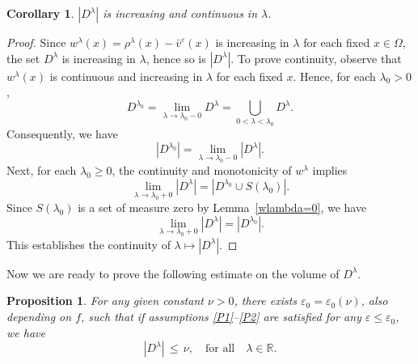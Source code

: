 \documentclass[a4paper,12pt,fullpage]{article}
\numberwithin{equation}{section}
\newtheorem{Cor}[Lemma]{Corollary}
\newtheorem{Prop}[Lemma]{Proposition}
\def\R{{\mathbb R}}
\def\ep{\varepsilon}
\begin{document}
\begin{Cor}\label{cor:D-lambda-conti}
$|D^\lambda|$ is increasing and continuous in $\lambda$. 
\end{Cor}

\begin{proof}
Since $w^\lambda(x)=\rho^\lambda(x)-\bar{v}^\ep(x)$ is increasing in $\lambda$ for each fixed $x\in\Omega$, the set $D^\lambda$ is increasing in $\lambda$, hence so is $|D^\lambda|$. To prove continuity, observe that $w^\lambda(x)$ is continuous and increasing in $\lambda$ for each fixed $x$. Hence, for each $\lambda_0>0$,
\[
D^{\lambda_0}=\lim_{\lambda\to\lambda_0-0}D^\lambda=\bigcup_{0<\lambda<\lambda_0} D^\lambda.
\]
Consequently, we have
\[
|D^{\lambda_0}|=\lim_{\lambda\to\lambda_0-0}|D^\lambda|.
\]
Next, for each $\lambda_0\geq 0$, the continuity and monotonicity of $w^\lambda$ implies
\[
\lim_{\lambda\to\lambda_0+0}|D^\lambda|=|D^{\lambda_0}\cup S(\lambda_0)|.
\]
Since $S(\lambda_0)$ is a set of measure zero by Lemma~\ref{wlambda=0}, we have
\[
\lim_{\lambda\to\lambda_0+0}|D^\lambda|=|D^{\lambda_0}|.
\]
This establishes the continuity of $\lambda\mapsto |D^\lambda|$.
\end{proof}

Now we are ready to prove the following estimate on the volume of $D^\lambda$.

\begin{Prop}\label{prop:estimateD}
For any given constant $\nu>0$, there exists $\ep_0= \ep_0(\nu)$, also depending on $f$, such that if assumptions \eqref{P1}--\eqref{P2} are satisfied for any $\ep \leq \ep_0$, we have
\begin{equation}\label{estimateD}
|D^\lambda| \, \leq \, \nu, \quad\text{for all} \quad \lambda\in\R.
\end{equation}
\end{Prop}
\end{document}
